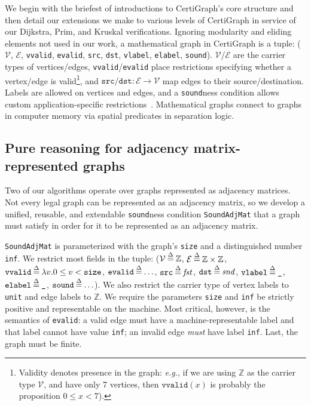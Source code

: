 We begin with the briefest of introductions to CertiGraph's core structure and then detail our extensions we make to various levels of
CertiGraph in service of our Dijkstra, Prim, and Kruskal verifications.
Ignoring modularity and eliding elements not used in our work, 
a mathematical graph in CertiGraph is a tuple:
($\mathcal{V}$, $\mathcal{E}$, \texttt{vvalid}, \texttt{evalid},
\texttt{src}, \texttt{dst}, \texttt{vlabel}, \texttt{elabel}, 
\texttt{sound}). $\mathcal{V}$/$\mathcal{E}$ are the carrier
types of vertices/edges, \texttt{vvalid}/\texttt{evalid}
place restrictions specifying whether a vertex/edge is 
valid\footnote{Validity denotes presence in the graph: \emph{e.g.}, if we are using $\mathbb{Z}$ as the carrier type $\mathcal{V}$, and have
only 7 vertices, then $\texttt{vvalid}(x)$ is probably the proposition $0 \le x < 7$).},
and $\texttt{src}/\texttt{dst} : \mathcal{E} \to \mathcal{V}$ map edges to their source/destination.
Labels are allowed on vertices and edges, and
a \texttt{sound}ness condition allows custom application-specific
restrictions~\cite{DBLP:journals/pacmpl/WangCMH19}.
Mathematical graphs connect to graphs in computer memory via spatial predicates in separation logic.

\subsection{Pure reasoning for adjacency matrix-represented graphs}
\label{sec:adjmatpure}

Two of our algorithms operate over graphs represented as adjacency matrices.
Not every legal graph can be represented as an adjacency matrix,
so we develop a unified, reusable, and extendable \texttt{sound}ness condition
\texttt{SoundAdjMat} that a graph must satisfy in order for it
to be represented as an adjacency matrix.

\texttt{SoundAdjMat} is parameterized with the graph's \texttt{size} and a distinguished number \texttt{inf}.
We restrict most fields in the tuple:
($\mathcal{V}\mathbin{\stackrel{\Delta}{=}}\mathbb{Z}$, $\mathcal{E}\mathbin{\stackrel{\Delta}{=}}\mathbb{Z} \times \mathbb{Z}$, $\texttt{vvalid}\mathbin{\stackrel{\Delta}{=}}\lambda v.0 \le v < \texttt{size}$, $\texttt{evalid}\mathbin{\stackrel{\Delta}{=}}\ldots$, $\texttt{src}\mathbin{\stackrel{\Delta}{=}}\mathit{fst}$, $\texttt{dst}\mathbin{\stackrel{\Delta}{=}}\mathit{snd}$, $\texttt{vlabel}\mathbin{\stackrel{\Delta}{=}}\texttt{\_}$, $\texttt{elabel}\mathbin{\stackrel{\Delta}{=}}\texttt{\_}$, $\texttt{sound}\mathbin{\stackrel{\Delta}{=}}\ldots$).  We also restrict the carrier type of vertex labels to \texttt{unit} and edge labels to $\mathbb{Z}$.
We require the parameters \texttt{size} and \texttt{inf} be
strictly positive and representable on the machine.
Most critical, however, is the semantics of \texttt{evalid}:
a valid edge must have a machine-representable label and that label
cannot have value \texttt{inf}; an invalid edge \emph{must} have label \texttt{inf}.
Last, the graph must be finite.

